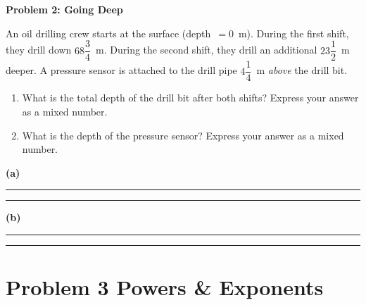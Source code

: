 \documentclass[11pt, a4paper]{article}
\newcommand{\answerline}{\par\vspace{0.5cm}\noindent\rule{\linewidth}{0.4pt}\par\vspace{0.1cm}}
\begin{document}
\begin{tcolorbox}[problem]
\textbf{Problem 2: Going Deep}

\medskip
An oil drilling crew starts at the surface (depth~$= 0$~m). During the first shift, they drill
down $68\dfrac{3}{4}$~m. During the second shift, they drill an additional $23\dfrac{1}{2}$~m deeper.
A pressure sensor is attached to the drill pipe $4\dfrac{1}{4}$~m \emph{above} the drill bit.

\medskip
\begin{enumerate}[label=(\alph*)]
  \item What is the total depth of the drill bit after both shifts? Express your answer as a mixed number.

  \item What is the depth of the pressure sensor? Express your answer as a mixed number.
\end{enumerate}
\end{tcolorbox}

\begin{tcolorbox}[answerbox]
\textbf{(a)} \answerline\answerline
\textbf{(b)} \answerline\answerline
\end{tcolorbox}

\clearpage


\section*{Problem 3 \hfill \normalfont\small\color{slate}Powers \& Exponents}
\end{document}
